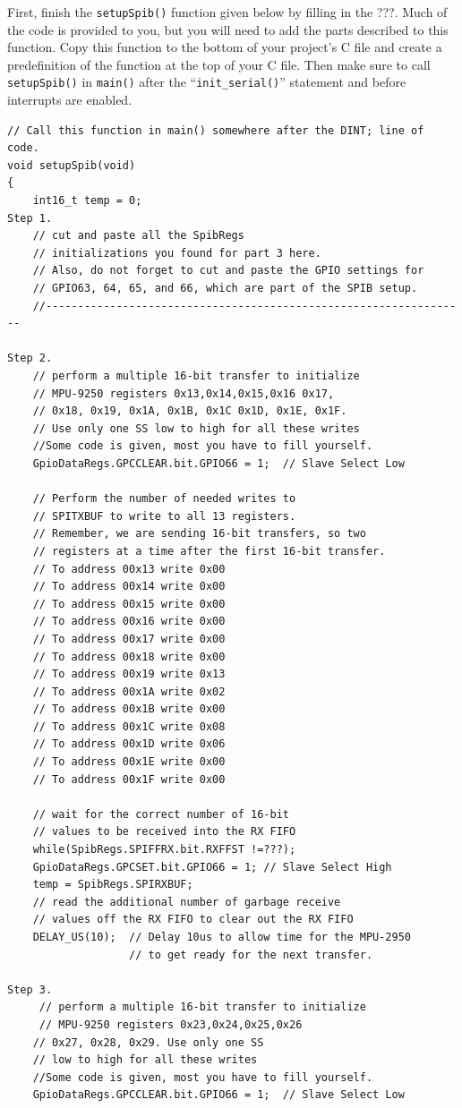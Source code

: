 \documentclass[11pt]{article}
\begin{document}
First, finish the \texttt{setupSpib()} function given below by filling in the ???. Much of the code is provided to you, but you will need to add the parts described to this function. Copy this function to the bottom of your project’s C file and create a predefinition of the function at the top of your C file. Then make sure to call \texttt{setupSpib()} in \texttt{main()} after the “\texttt{init_serial()}” statement and before interrupts are enabled.
%
\begin{verbatim}
// Call this function in main() somewhere after the DINT; line of code.
void setupSpib(void)
{
    int16_t temp = 0;
Step 1.
    // cut and paste all the SpibRegs
    // initializations you found for part 3 here.
    // Also, do not forget to cut and paste the GPIO settings for
    // GPIO63, 64, 65, and 66, which are part of the SPIB setup.
    //------------------------------------------------------------------

Step 2.
    // perform a multiple 16-bit transfer to initialize
    // MPU-9250 registers 0x13,0x14,0x15,0x16 0x17,
    // 0x18, 0x19, 0x1A, 0x1B, 0x1C 0x1D, 0x1E, 0x1F.
    // Use only one SS low to high for all these writes
    //Some code is given, most you have to fill yourself.
    GpioDataRegs.GPCCLEAR.bit.GPIO66 = 1;  // Slave Select Low

    // Perform the number of needed writes to
    // SPITXBUF to write to all 13 registers.
    // Remember, we are sending 16-bit transfers, so two
    // registers at a time after the first 16-bit transfer.
    // To address 00x13 write 0x00
    // To address 00x14 write 0x00
    // To address 00x15 write 0x00
    // To address 00x16 write 0x00
    // To address 00x17 write 0x00
    // To address 00x18 write 0x00
    // To address 00x19 write 0x13
    // To address 00x1A write 0x02
    // To address 00x1B write 0x00
    // To address 00x1C write 0x08
    // To address 00x1D write 0x06
    // To address 00x1E write 0x00
    // To address 00x1F write 0x00

    // wait for the correct number of 16-bit
    // values to be received into the RX FIFO
    while(SpibRegs.SPIFFRX.bit.RXFFST !=???);
    GpioDataRegs.GPCSET.bit.GPIO66 = 1; // Slave Select High
    temp = SpibRegs.SPIRXBUF;
    // read the additional number of garbage receive
    // values off the RX FIFO to clear out the RX FIFO
    DELAY_US(10);  // Delay 10us to allow time for the MPU-2950
                   // to get ready for the next transfer.

Step 3.
     // perform a multiple 16-bit transfer to initialize
     // MPU-9250 registers 0x23,0x24,0x25,0x26
    // 0x27, 0x28, 0x29. Use only one SS
    // low to high for all these writes
    //Some code is given, most you have to fill yourself.
    GpioDataRegs.GPCCLEAR.bit.GPIO66 = 1;  // Slave Select Low


\end{verbatim}
\end{document}
